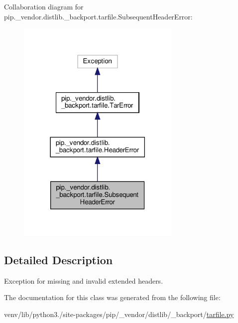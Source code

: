 Collaboration diagram for pip.\+\_\+vendor.\+distlib.\+\_\+backport.\+tarfile.\+Subsequent\+Header\+Error\+:
\nopagebreak
\begin{figure}[H]
\begin{center}
\leavevmode
\includegraphics[width=222pt]{classpip_1_1__vendor_1_1distlib_1_1__backport_1_1tarfile_1_1SubsequentHeaderError__coll__graph}
\end{center}
\end{figure}


\subsection{Detailed Description}
\begin{DoxyVerb}Exception for missing and invalid extended headers.\end{DoxyVerb}
 

The documentation for this class was generated from the following file\+:\begin{DoxyCompactItemize}
\item 
venv/lib/python3./site-\/packages/pip/\+\_\+vendor/distlib/\+\_\+backport/\hyperlink{tarfile_8py}{tarfile.\+py}\end{DoxyCompactItemize}
